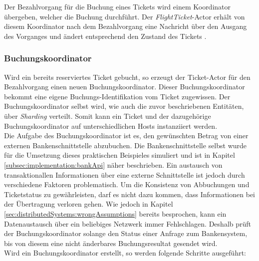 % 
% 
Der Bezahlvorgang für die Buchung eines Tickets wird einem Koordinator übergeben, welcher die Buchung durchführt. Der \textit{FlightTicket}-Actor erhält von diesem Koordinator nach dem Bezahlvorgang eine Nachricht über den Ausgang des Vorganges und ändert entsprechend den Zustand des Tickets .

\subsubsection{Buchungskoordinator}
\label{subsub:implementation:ChargingCoordinator}
Wird ein bereits reserviertes Ticket gebucht, so erzeugt der Ticket-Actor für den Bezahlvorgang einen neuen Buchungskoordinator. Dieser Buchungskoordinator bekommt eine eigene Buchungs-Identifikation vom Ticket zugewissen. Der Buchungskoordinator selbst wird, wie auch die zuvor beschriebenen Entitäten, über \textit{Sharding} verteilt. Somit kann ein Ticket und der dazugehörige Buchungskoordinator auf unterschiedlichen Hosts instanziiert werden. \\
Die Aufgabe des Buchungskoordinator ist es, den gewünschten Betrag von einer externen Bankenschnittstelle abzubuchen. Die Bankenschnittstelle selbst wurde für die Umsetzung dieses praktischen Beispieles simuliert und ist in Kapitel \ref{subsec:implementation:bankApi} näher beschrieben. Ein austausch von transaktionallen Informationen über eine externe Schnittstelle ist jedoch durch verschiedene Faktoren problematisch. Um die Konsistenz von Abbuchungen und Ticketstatus zu gewährleisten, darf es nicht dazu kommen, dass Informationen bei der Übertragung verloren gehen. Wie jedoch in Kapitel \ref{sec:distributedSystems:wrongAssumptions} bereits besprochen, kann ein Datenaustausch über ein beliebiges Netzwerk immer Fehlschlagen. Deshalb prüft der Buchungskoordinator solange den Status einer Anfrage zum Bankensystem, bis von diesem eine nicht änderbares Buchungsresultat gesendet wird. \\
Wird ein Buchungskoordinator erstellt, so werden folgende Schritte ausgeführt:
